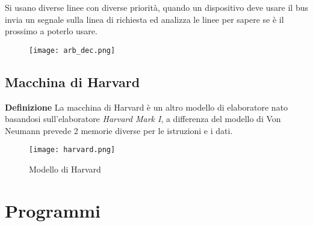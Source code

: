 \documentclass{article}
\begin{document}
\begin{itemize}
\begin{itemize}
\begin{itemize}
                        Si usano diverse linee con diverse priorità, quando un dispositivo deve usare il bus invia un segnale sulla linea di richiesta ed analizza le linee per sapere se è il prossimo a poterlo usare.

                        \begin{figure}[ht]
                        \centering
                        \texttt{[image: arb\_dec.png]}
                        \label{fig:ar_dec}
                        \end{figure}    
                        
                \end{itemize}
                    
        \end{itemize}
    
\end{itemize}

\newpage

\subsection{Macchina di Harvard}

\textbf{Definizione} La macchina di Harvard è un altro modello di elaboratore nato basandosi sull'elaboratore \textit{Harvard Mark I}, a differenza del modello di Von Neumann prevede 2 memorie diverse per le istruzioni e i dati.

\begin{figure}[ht]
    \centering
    \texttt{[image: harvard.png]}
    \caption{Modello di Harvard}
    \label{fig:harvard}
\end{figure}

\section{Programmi}
\end{document}

